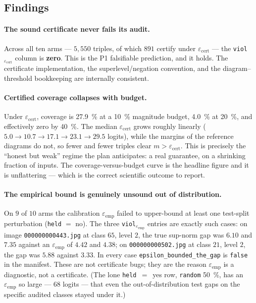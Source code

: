 \documentclass[11pt]{article}
\newcommand{\code}[1]{\texttt{\small #1}}
\newcommand{\epscert}{\varepsilon_{\mathrm{cert}}}
\newcommand{\epsemp}{\varepsilon_{\mathrm{emp}}}
\theoremstyle{definition}
\theoremstyle{plain}
\begin{document}
\subsection{Findings}

\paragraph{The sound certificate never fails its audit.} Across all ten arms ---
$5{,}550$ triples, of which $891$ certify under $\epscert$ --- the
\code{viol}$_{\epscert}$ column is \textbf{zero}. This is the P1 falsifiable
prediction, and it holds. The certificate implementation, the superlevel/negation
convention, and the diagram--threshold bookkeeping are internally consistent.

\paragraph{Certified coverage collapses with budget.} Under $\epscert$, coverage
is \SI{27.9}{\percent} at a \SI{10}{\percent} magnitude budget, \SI{4.0}{\percent}
at \SI{20}{\percent}, and effectively zero by \SI{40}{\percent}. The median
$\epscert$ grows roughly linearly ($5.0 \to 10.7 \to 17.1 \to 23.1 \to 29.5$
logits), while the margins of the reference diagrams do not, so fewer and fewer
triples clear $m > \epscert$. This is precisely the ``honest but weak'' regime
the plan anticipates: a real guarantee, on a shrinking fraction of inputs. The
coverage-versus-budget curve is the headline figure and it is unflattering ---
which is the correct scientific outcome to report.

\paragraph{The empirical bound is genuinely unsound out of distribution.} On $9$
of $10$ arms the calibration $\epsemp$ failed to upper-bound at least one
test-split perturbation (\code{held} $=$ no). The three
\code{viol}$_{\epsemp}$ entries are exactly such cases: on image
\code{000000000443.jpg} at class $65$, level $2$, the true sup-norm gap was
$6.10$ and $7.35$ against an $\epsemp$ of $4.42$ and $4.38$; on
\code{000000000502.jpg} at class $21$, level $2$, the gap was $5.88$ against
$3.33$. In every case \code{epsilon\_bounded\_the\_gap} is \code{false} in the
manifest. These are not certificate bugs; they are the reason $\epsemp$ is a
diagnostic, not a certificate. (The lone \code{held}~$=$~yes row, \code{random}
\SI{50}{\percent}, has an $\epsemp$ so large --- $68$ logits --- that even the
out-of-distribution test gaps on the specific audited classes stayed under it.)
\end{document}
